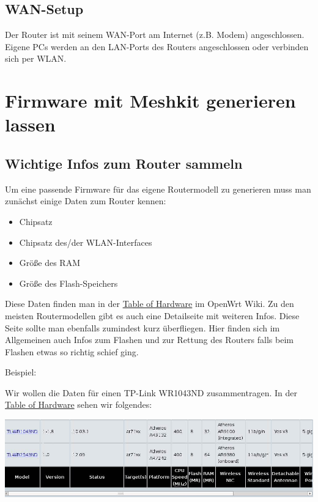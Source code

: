 \documentclass[a4paper,12pt,ngerman]{sphinxmanual}
\begin{document}
\section{WAN-Setup}
\label{get/integration-into-networks:wan-setup}
Der Router ist mit seinem WAN-Port am Internet (z.B. Modem) angeschlossen.
Eigene PCs werden an den LAN-Ports des Routers angeschlossen oder verbinden
sich per WLAN.


\chapter{Firmware mit Meshkit generieren lassen}
\label{generate:sphinx}\label{generate:firmware-mit-meshkit-generieren-lassen}\label{generate::doc}

\section{Wichtige Infos zum Router sammeln}
\label{generate:infos-zum-router-sammeln}\label{generate:wichtige-infos-zum-router-sammeln}
Um eine passende Firmware für das eigene Routermodell zu generieren muss man
zunächst einige Daten zum Router kennen:
\begin{itemize}
\item {} 
Chipsatz

\item {} 
Chipsatz des/der WLAN-Interfaces

\item {} 
Größe des RAM

\item {} 
Größe des Flash-Speichers

\end{itemize}

Diese Daten finden man in der \href{http://wiki.openwrt.org/toh/start}{Table of Hardware} im OpenWrt Wiki. Zu den
meisten Routermodellen gibt es auch eine Detailseite mit weiteren Infos. Diese
Seite sollte man ebenfalls zumindest kurz überfliegen. Hier finden sich
im Allgemeinen auch Infos zum Flashen und zur Rettung des Routers falls beim
Flashen etwas so richtig schief ging.

Beispiel:

Wir wollen die Daten für einen TP-Link WR1043ND zusammentragen. In der
\href{http://wiki.openwrt.org/toh/start}{Table of Hardware} sehen wir folgendes:

\includegraphics{toh-wr1043nd.jpg}
\end{document}

